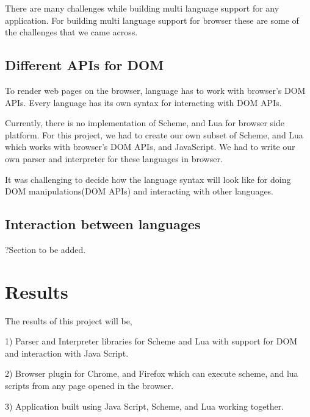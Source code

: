 There are many challenges while building multi language support for any application. For building multi language support for browser these are some of the challenges that we came across.

\subsection{Different APIs for DOM}

To render web pages on the browser, language has to work with browser's DOM APIs. Every language has its own syntax for interacting with DOM APIs. 


Currently, there is no implementation of Scheme, and Lua for browser side platform. For this project, we had to create our own subset of Scheme, and Lua which works with browser's DOM APIs, and JavaScript. We had to write our own parser and interpreter for these languages in browser.

It was challenging to decide how the language syntax will look like for doing DOM manipulations(DOM APIs) and interacting with other languages.



\subsection{Interaction between languages}

?Section to be added.


\section{Results}

The results of this project will be, 

1) Parser and Interpreter libraries for Scheme and Lua with support for DOM and interaction with Java Script.

2) Browser plugin for Chrome, and Firefox which can execute scheme, and lua scripts from any page opened in the browser.

3) Application built using Java Script, Scheme, and Lua working together.
